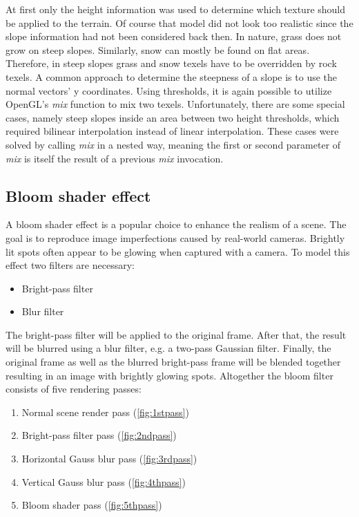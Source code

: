 \documentclass[11pt,a4paper,twoside,openright]{report}
\begin{document}
At first only the height information was used to determine which texture should be applied to the terrain. Of course that model did not look too realistic since the slope information had not been considered back then. In nature, grass does not grow on steep slopes. Similarly, snow can mostly be found on flat areas. Therefore, in steep slopes grass and snow texels have to be overridden by rock texels. A common approach to determine the steepness of a slope is to use the normal vectors' y coordinates. Using thresholds, it is again possible to utilize OpenGL's \emph{mix} function to mix two texels. Unfortunately, there are some special cases, namely steep slopes inside an area between two height thresholds, which required bilinear interpolation instead of linear interpolation. These cases were solved by calling \emph{mix} in a nested way, meaning the first or second parameter of \emph{mix} is itself the result of a previous \emph{mix} invocation.

\subsection{Bloom shader effect}
A bloom shader effect is a popular choice to enhance the realism of a scene. The goal is to reproduce image imperfections caused by real-world cameras. Brightly lit spots often appear to be glowing when captured with a camera. To model this effect two filters are necessary:
\begin{itemize}
\item Bright-pass filter
\item Blur filter
\end{itemize}
The bright-pass filter will be applied to the original frame. After that, the result will be blurred using a blur filter, e.g. a two-pass Gaussian filter. Finally, the original frame as well as the blurred bright-pass frame will be blended together resulting in an image with brightly glowing spots. Altogether the bloom filter consists of five rendering passes:
\begin{enumerate}
  \item Normal scene render pass (\cref{fig:1stpass})
  \item Bright-pass filter pass (\cref{fig:2ndpass})
  \item Horizontal Gauss blur pass (\cref{fig:3rdpass})
  \item Vertical Gauss blur pass (\cref{fig:4thpass})
  \item Bloom shader pass (\cref{fig:5thpass})
\end{enumerate}
\end{document}
